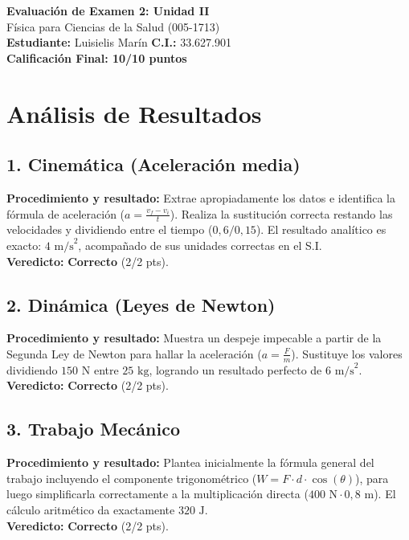 \documentclass[12pt,letterpaper]{article}
\begin{document}
\begin{center}
    \Large \textbf{Evaluación de Examen 2: Unidad II} \\
    \large Física para Ciencias de la Salud (005-1713) \\
    \vspace{0.5cm}
    \textbf{Estudiante:} Luisielis Marín \quad \textbf{C.I.:} 33.627.901
    \vspace{0.3cm} \\
    \large \textbf{Calificación Final: 10/10 puntos}
\end{center}

\vspace{0.5cm}

\section*{Análisis de Resultados}

\subsection*{1. Cinemática (Aceleración media)}
\textbf{Procedimiento y resultado:} Extrae apropiadamente los datos e identifica la fórmula de aceleración ($a = \frac{v_f - v_i}{t}$). Realiza la sustitución correcta restando las velocidades y dividiendo entre el tiempo ($0,6 / 0,15$). El resultado analítico es exacto: $4 \text{ m/s}^2$, acompañado de sus unidades correctas en el S.I. \\
\textbf{Veredicto:} \textbf{Correcto} (2/2 pts).

\subsection*{2. Dinámica (Leyes de Newton)}
\textbf{Procedimiento y resultado:} Muestra un despeje impecable a partir de la Segunda Ley de Newton para hallar la aceleración ($a = \frac{F}{m}$). Sustituye los valores dividiendo $150 \text{ N}$ entre $25 \text{ kg}$, logrando un resultado perfecto de $6 \text{ m/s}^2$. \\
\textbf{Veredicto:} \textbf{Correcto} (2/2 pts).

\subsection*{3. Trabajo Mecánico}
\textbf{Procedimiento y resultado:} Plantea inicialmente la fórmula general del trabajo incluyendo el componente trigonométrico ($W = F \cdot d \cdot \cos(\theta)$), para luego simplificarla correctamente a la multiplicación directa ($400 \text{ N} \cdot 0,8 \text{ m}$). El cálculo aritmético da exactamente $320 \text{ J}$. \\
\textbf{Veredicto:} \textbf{Correcto} (2/2 pts).
\end{document}
